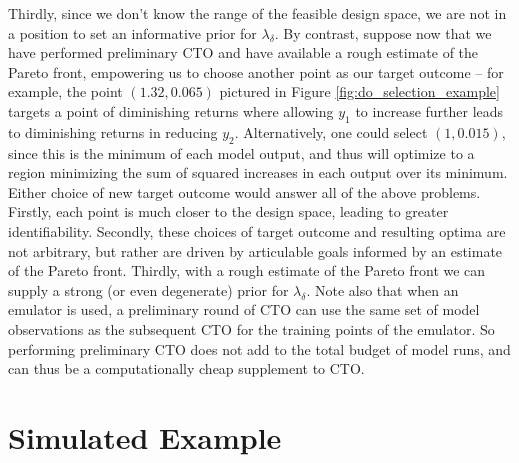 \documentclass[12pt]{article}
\begin{document}
%
Thirdly, since we don't know the range of the feasible design space, we are not in a position to set an informative prior for $\lambda_\delta$.
%
By contrast, suppose now that we have performed preliminary CTO and have available a rough estimate of the Pareto front, empowering us to choose another point as our target outcome -- for example, the point $(1.32,0.065)$ pictured in Figure \ref{fig:do_selection_example} targets a point of diminishing returns where allowing $y_1$ to increase further leads to diminishing returns in reducing $y_2$.
%
Alternatively, one could select $(1,0.015)$, since this is the minimum of each model output, and thus will optimize to a region minimizing the sum of squared increases in each output over its minimum.
%
Either choice of new target outcome would answer all of the above problems.
%
Firstly, each point is much closer to the design space, leading to greater identifiability.
%
Secondly, these choices of target outcome and resulting optima are not arbitrary, but rather are driven by articulable goals informed by an estimate of the Pareto front.
%
Thirdly, with a rough estimate of the Pareto front we can supply a strong (or even degenerate) prior for $\lambda_\delta$.
%
Note also that when an emulator is used, a preliminary round of CTO can use the same set of model observations as the subsequent CTO for the training points of the emulator.
%
So performing preliminary CTO does not add to the total budget of model runs, and can thus be a computationally cheap supplement to CTO.
%

%
\section{Simulated Example}\label{example}
%
\end{document}
